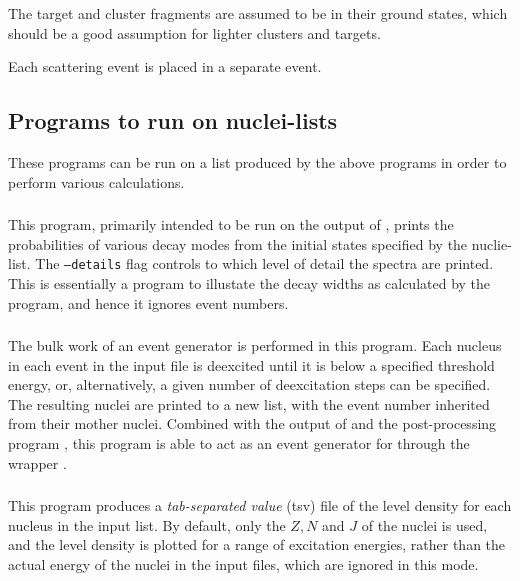 The target and cluster fragments are assumed to be in their ground states, which should be a good assumption for lighter clusters and targets.

Each scattering event is placed in a separate event.

\subsection{Programs to run on nuclei-lists}
These programs can be run on a list produced by the above programs in order to perform various calculations. 

\subsubsection{}
This program, primarily intended to be run on the output of , prints the probabilities of various decay modes from the initial states specified by the nuclie-list. The \texttt{--details} flag controls to which level of detail the spectra are printed. This is essentially a program to illustate the decay widths as calculated by the program, and hence it ignores event numbers.

\subsubsection{}
The bulk work of an event generator is performed in this program. Each nucleus in each event in the input file is deexcited until it is below a specified threshold energy, or, alternatively, a given number of deexcitation steps can be specified. The resulting nuclei are printed to a new list, with the event number inherited from their mother nuclei. Combined with the output of  and the post-processing program , this program is able to act as an event generator for  through the wrapper .

\subsubsection{}
This program produces a \emph{tab-separated value} (tsv) file of the level density for each nucleus in the input list. By default, only the $Z, N$ and $J$ of the nuclei is used, and the level density is plotted for a range of excitation energies, rather than the actual energy of the nuclei in the input files, which are ignored in this mode.

